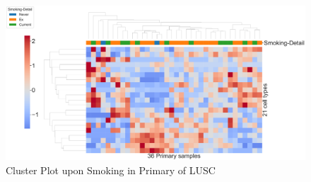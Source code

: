 \documentclass{beamer}
\begin{document}
\begin{frame}[allowframebreaks]
        \begin{figure}
            \includegraphics[width=0.9 \linewidth]{figures/BisqueRNA/clustermap/STAR.FPKM.GSE162498.SQC.Smoking/Primary.pdf}
            \caption{Cluster Plot upon Smoking in Primary of LUSC}
        \end{figure}
    \end{frame}
\end{document}
